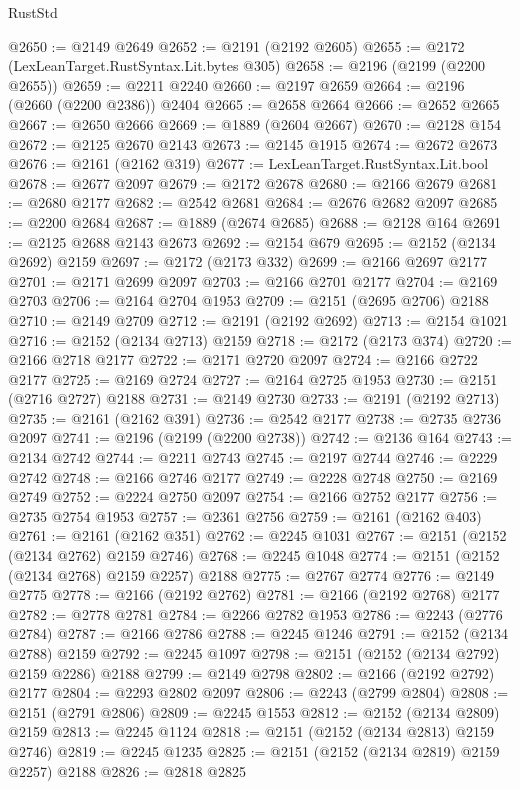 \begin{lexlean}{RustStd}
\begin{coremodule}
@2650 := @2149 @2649
@2652 := @2191 (@2192 @2605)
@2655 := @2172 (LexLeanTarget.RustSyntax.Lit.bytes @305)
@2658 := @2196 (@2199 (@2200 @2655))
@2659 := @2211 @2240
@2660 := @2197 @2659
@2664 := @2196 (@2660 (@2200 @2386)) @2404
@2665 := @2658 @2664
@2666 := @2652 @2665
@2667 := @2650 @2666
@2669 := @1889 (@2604 @2667)
@2670 := @2128 @154
@2672 := @2125 @2670 @2143
@2673 := @2145 @1915
@2674 := @2672 @2673
@2676 := @2161 (@2162 @319)
@2677 := LexLeanTarget.RustSyntax.Lit.bool
@2678 := @2677 @2097
@2679 := @2172 @2678
@2680 := @2166 @2679
@2681 := @2680 @2177
@2682 := @2542 @2681
@2684 := @2676 @2682 @2097
@2685 := @2200 @2684
@2687 := @1889 (@2674 @2685)
@2688 := @2128 @164
@2691 := @2125 @2688 @2143 @2673
@2692 := @2154 @679
@2695 := @2152 (@2134 @2692) @2159
@2697 := @2172 (@2173 @332)
@2699 := @2166 @2697 @2177
@2701 := @2171 @2699 @2097
@2703 := @2166 @2701 @2177
@2704 := @2169 @2703
@2706 := @2164 @2704 @1953
@2709 := @2151 (@2695 @2706) @2188
@2710 := @2149 @2709
@2712 := @2191 (@2192 @2692)
@2713 := @2154 @1021
@2716 := @2152 (@2134 @2713) @2159
@2718 := @2172 (@2173 @374)
@2720 := @2166 @2718 @2177
@2722 := @2171 @2720 @2097
@2724 := @2166 @2722 @2177
@2725 := @2169 @2724
@2727 := @2164 @2725 @1953
@2730 := @2151 (@2716 @2727) @2188
@2731 := @2149 @2730
@2733 := @2191 (@2192 @2713)
@2735 := @2161 (@2162 @391)
@2736 := @2542 @2177
@2738 := @2735 @2736 @2097
@2741 := @2196 (@2199 (@2200 @2738))
@2742 := @2136 @164
@2743 := @2134 @2742
@2744 := @2211 @2743
@2745 := @2197 @2744
@2746 := @2229 @2742
@2748 := @2166 @2746 @2177
@2749 := @2228 @2748
@2750 := @2169 @2749
@2752 := @2224 @2750 @2097
@2754 := @2166 @2752 @2177
@2756 := @2735 @2754 @1953
@2757 := @2361 @2756
@2759 := @2161 (@2162 @403)
@2761 := @2161 (@2162 @351)
@2762 := @2245 @1031
@2767 := @2151 (@2152 (@2134 @2762) @2159 @2746)
@2768 := @2245 @1048
@2774 := @2151 (@2152 (@2134 @2768) @2159 @2257) @2188
@2775 := @2767 @2774
@2776 := @2149 @2775
@2778 := @2166 (@2192 @2762)
@2781 := @2166 (@2192 @2768) @2177
@2782 := @2778 @2781
@2784 := @2266 @2782 @1953
@2786 := @2243 (@2776 @2784)
@2787 := @2166 @2786
@2788 := @2245 @1246
@2791 := @2152 (@2134 @2788) @2159
@2792 := @2245 @1097
@2798 := @2151 (@2152 (@2134 @2792) @2159 @2286) @2188
@2799 := @2149 @2798
@2802 := @2166 (@2192 @2792) @2177
@2804 := @2293 @2802 @2097
@2806 := @2243 (@2799 @2804)
@2808 := @2151 (@2791 @2806)
@2809 := @2245 @1553
@2812 := @2152 (@2134 @2809) @2159
@2813 := @2245 @1124
@2818 := @2151 (@2152 (@2134 @2813) @2159 @2746)
@2819 := @2245 @1235
@2825 := @2151 (@2152 (@2134 @2819) @2159 @2257) @2188
@2826 := @2818 @2825

\end{coremodule}
\end{lexlean}
